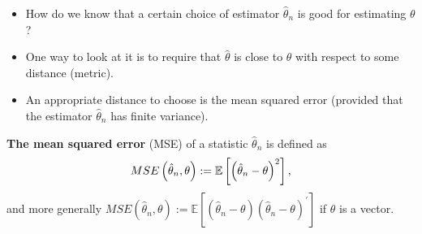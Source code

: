 \documentclass[notes=show]{beamer}
\begin{document}
\begin{frame}%


\begin{itemize}
\item How do we know that a certain choice of estimator $\hat{\theta}_{n}$
is good for estimating $\theta $?

\item One way to look at it is to require that $\hat{\theta}$ is close to $%
\theta $ with respect to some distance (metric).

\item An appropriate distance to choose is the mean squared error (provided
that the estimator $\hat{\theta}_{n}$ has finite variance).
\end{itemize}

\begin{definition}
\textbf{The mean squared error} (MSE) of a statistic $\hat{\theta}_{n}$ is
defined as 
\begin{equation*}
MSE\left( \hat{\theta}_{n},\theta \right) :=\mathbb{E}\left[ \left( \hat{%
\theta}_{n}-\theta \right) ^{2}\right] ,
\end{equation*}%
and more generally $MSE\left( \hat{\theta}_{n},\theta \right) :=\mathbb{E}%
\left[ \left( \hat{\theta}_{n}-\theta \right) \left( \hat{\theta}_{n}-\theta
\right) ^{\prime }\right] $ if $\theta $ is a vector.
\end{definition}

\end{frame}%
\end{document}
